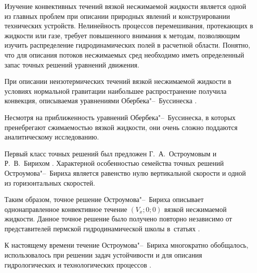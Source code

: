
\renewcommand{\JournalDataOnline}{\displaydate{burme}}







\makerutitle






Изучение конвективных течений вязкой несжимаемой жидкости  является одной из главных проблем при описании природных явлений и конструировании технических устройств. Нелинейность процессов перемешивания, протекающих в жидкости или газе, требует повышенного внимания к методам, позволяющим изучить распределение гидродинамических полей в расчетной области. Понятно, что для описания потоков несжимаемых сред необходимо иметь определенный запас точных решений уравнений движения.



При описании неизотермических течений вязкой несжимаемой жидкости в условиях нормальной гравитации наибольшее распространение получила конвекция, описываемая уравнениями Обербека"--~Буссинеска \cite{Joseph, Gershuni1989, Pukhnachev4}. 

Несмотря на приближенность уравнений Обербека"--~Буссинеска, в которых пренебрегают сжимаемостью вязкой жидкости, они очень сложно поддаются аналитическому исследованию.



Первый класс точных решений был предложен Г.~А.~Остроумовым \cite{Ostroumov} и Р.~В.~Бирихом \cite{Birikh}. Характерной особенностью семейства точных решений Остроумова"--~Бириха является равенство нулю вертикальной скорости и одной из горизонтальных скоростей. 

Таким образом, точное решение Остроумова"--~Бириха описывает однонаправленное конвективное течение $ (V_x; 0; 0)$ вязкой несжимаемой жидкости. Данное точное решение было получено повторно независимо от представителей пермской гидродинамической школы в~статьях \cite{Ortiz, Smith}.



К настоящему времени течение Остроумова"--~Бириха многократно обобщалось, использовалось при решении задач устойчивости и для описания гидрологических и технологических процессов \cite{Andreev, Andreev_bek, Andreev_step, Bek_Gon_Rez_Shef, Bir_Den_Kost1, Bir_Den_Kost2, Bir_Pukhn, Birikh2, Gon_Kab2, Gon_rez, Pukhnachev6}.

